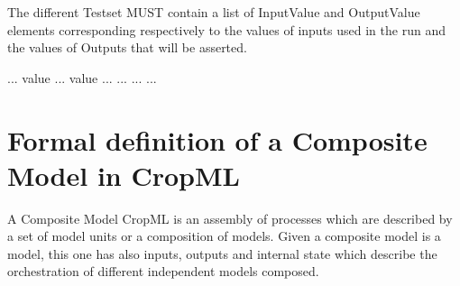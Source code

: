 \documentclass[letterpaper,13pt,english]{sphinxmanual}
\begin{document}
\begin{DUlineblock}{0em}
\item[] The different Testset MUST contain a list of InputValue and OutputValue elements corresponding respectively to the values
of inputs used in the run and the values of Outputs that will be asserted.
\end{DUlineblock}

%
\begin{sphinxVerbatim}[commandchars=\\\{\}]
    
   ...
            
           
          
             value
            ...
              value
            ...
         ...
      ...
  ...
\end{sphinxVerbatim}


\section{Formal definition of a Composite Model in CropML}
\label{\detokenize{user/description:formal-definition-of-a-composite-model-in-cropml}}
\begin{DUlineblock}{0em}
\item[] A Composite Model CropML is an assembly of processes which are described by a set of model units or a composition of models.
Given a composite model is a model, this one has also inputs, outputs and internal state which describe the orchestration of different
independent models composed.
\end{DUlineblock}
\end{document}
